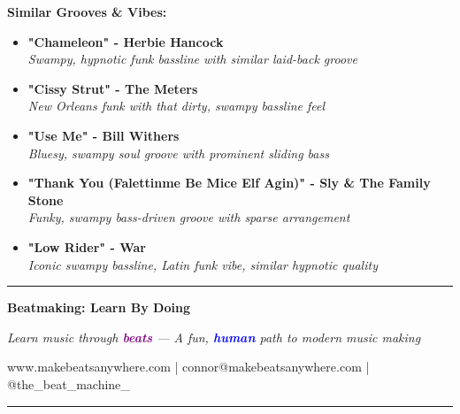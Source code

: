 \documentclass[11pt,letterpaper]{article}
\newcommand{\purple}[1]{\textcolor{purple}{\textbf{#1}}}
\newcommand{\bluepurple}[1]{\textcolor{blue}{\textbf{#1}}}
\begin{document}
\begin{tcolorbox}[colback=blue!5,colframe=blue,width=\textwidth,arc=3mm,boxrule=1pt]
\textbf{Similar Grooves \& Vibes:}

\begin{itemize}[leftmargin=*, itemsep=0.3em]
\item \textbf{"Chameleon" - Herbie Hancock} \\
    \textit{Swampy, hypnotic funk bassline with similar laid-back groove}
\item \textbf{"Cissy Strut" - The Meters} \\
    \textit{New Orleans funk with that dirty, swampy bassline feel}
\item \textbf{"Use Me" - Bill Withers} \\
    \textit{Bluesy, swampy soul groove with prominent sliding bass}
\item \textbf{"Thank You (Falettinme Be Mice Elf Agin)" - Sly \& The Family Stone} \\
    \textit{Funky, swampy bass-driven groove with sparse arrangement}
\item \textbf{"Low Rider" - War} \\
    \textit{Iconic swampy bassline, Latin funk vibe, similar hypnotic quality}
\end{itemize}
\end{tcolorbox}

\vspace{1cm}

\begin{center}
\rule{0.8\textwidth}{0.5pt}

\vspace{0.3cm}

\textbf{Beatmaking: Learn By Doing}

\textit{Learn music through \purple{beats} — A fun, \bluepurple{human} path to modern music making}

\vspace{0.3cm}

\small www.makebeatsanywhere.com | connor@makebeatsanywhere.com | @the\_beat\_machine\_

\vspace{0.3cm}

\rule{0.8\textwidth}{0.5pt}
\end{center}
\end{document}
